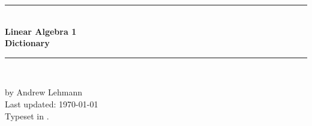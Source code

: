 \thispagestyle{empty}
\begin{titlepage}

\newcommand{\HRule}{\rule{\linewidth}{1mm}} %

\center %
 

\vspace*{8cm}

\HRule \\[0.4cm]
\vspace{0.5cm}
{ \fontsize{40}{10} \bfseries Linear Algebra 1} \\ [1cm]
{ \huge \bfseries Dictionary} \\ \vspace{0.5cm}
\HRule \\[10cm]
 

\begin{minipage}{0.4\textwidth}
\centering by Andrew Lehmann \\
\centering Last updated: \today \\
Typeset in \LaTeXe.
\end{minipage}

\vfill %


\end{titlepage}
